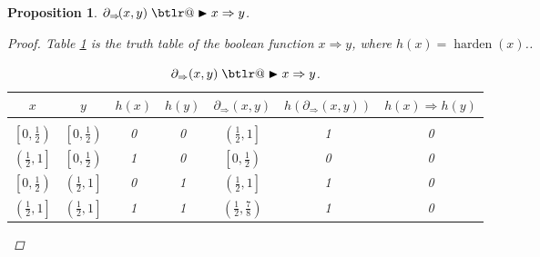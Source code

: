 \documentclass{article}
\makeatletter
\theoremstyle{plain}
\newtheorem{proposition}[theorem]{Proposition}
\theoremstyle{definition}
\theoremstyle{remark}
\DeclareRobustCommand{\btright}{\mathrel{\mathpalette\btlr@\blacktriangleright}}
\newcommand{\btlr@}[2]{%
	\begingroup
	\sbox\z@{$\m@th#1\triangleright$}%
	\sbox\tw@{\resizebox{1.1\wd\z@}{1.1\ht\z@}{\raisebox{\depth}{$\m@th#1\mkern-1mu#2$}}}%
	\ht\tw@=\ht\z@ \dp\tw@=\dp\z@ \wd\tw@=\wd\z@
	\copy\tw@
	\endgroup
}
\makeatother
\begin{document}
\begin{proposition}\label{prop:implies}
	$\partial_{\Rightarrow}\!(x,y) \btright x \Rightarrow y$.
	\begin{proof}
		Table \ref{implies-table} is the truth table of the boolean function $x \Rightarrow y$, where $h(x) = \operatorname{harden}(x)$..
		\begin{table}[h!]
			\begin{center}
				\begin{tabular}{ccccccc}
					\multicolumn{1}{c}{$x$}  &\multicolumn{1}{c}{$y$}  &\multicolumn{1}{c}{$h(x)$}  &\multicolumn{1}{c}{$h(y)$} &\multicolumn{1}{c}{$\partial_{\Rightarrow}(x, y)$} &\multicolumn{1}{c}{$h(\partial_{\Rightarrow}(x, y))$}
					&\multicolumn{1}{c}{$h(x) \Rightarrow h(y)$}
					\\ \hline \\
					$\left[0, \frac{1}{2}\right)$ & $\left[0, \frac{1}{2}\right)$ & 0 & 0 & $\left(\frac{1}{2}, 1\right]$ & 1 & 0\\[0.1cm]
					$\left(\frac{1}{2}, 1\right]$ & $\left[0, \frac{1}{2}\right)$ &1 & 0 & $\left[0, \frac{1}{2}\right)$ & 0 & 0\\[0.1cm]
					$\left[0, \frac{1}{2}\right)$ & $\left(\frac{1}{2}, 1\right]$ &0 & 1 & $\left(\frac{1}{2},1\right]$ & 1 & 0\\[0.1cm]
					$\left(\frac{1}{2}, 1\right]$ & $\left(\frac{1}{2}, 1\right]$ &1 & 1 & $\left(\frac{1}{2}, \frac{7}{8}\right)$ & 1 & 0\\[0.1cm]
				\end{tabular}
			\end{center}
			\caption{$\partial_{\Rightarrow}(x,y) \btright x \Rightarrow y$.}\label{implies-table}
		\end{table}			
	\end{proof}
\end{proposition}
\end{document}

